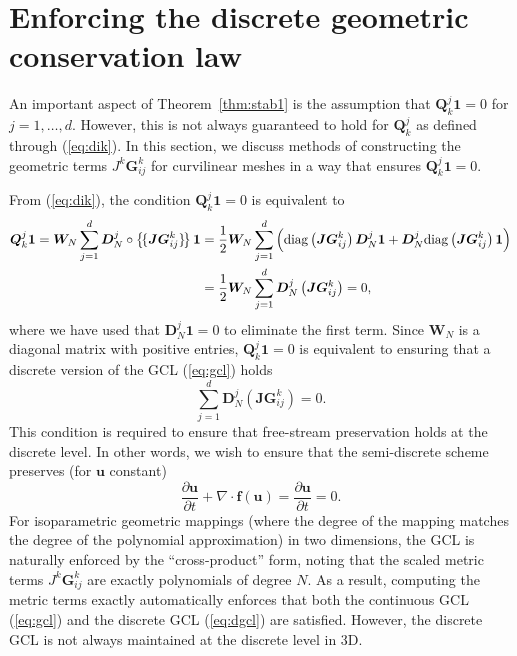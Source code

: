 \documentclass[preprint,10pt]{article}
\theoremstyle{definition}
\theoremstyle{lemma}
\theoremstyle{theorem}
\theoremstyle{assumption}
\newcommand{\pd}[2]{\frac{\partial#1}{\partial#2}}
\newcommand{\LRp}[1]{\left( #1 \right)}
\newcommand{\LRc}[1]{\left\{ #1 \right\}}
\newcommand{\avg}[1] {\ensuremath{\LRc{\!\{#1\}\!}}}
\newcommand{\Grad} {\ensuremath{\nabla}}
\newcommand{\diag}[1]{{\rm diag}\LRp{#1}}
\begin{document}
{\section{Enforcing the discrete geometric conservation law}

An important aspect of Theorem~\ref{thm:stab1} is the assumption that $\bm{Q}^j_k\bm{1} = 0$ for $j = 1,\ldots,d$.  However, this is not always guaranteed to hold for $\bm{Q}^j_k$ as defined through (\ref{eq:dik}).  In this section, we discuss methods of constructing the geometric terms $J^k\bm{G}^k_{ij}$ for curvilinear meshes in a way that ensures $\bm{Q}^j_k\bm{1} = 0$.  

From (\ref{eq:dik}), the condition $\bm{Q}^j_k\bm{1} = 0$ is equivalent to
\begin{align*}
\bm{Q}^j_k\bm{1} = \bm{W}_N\sum_{j=1}^d\bm{D}^j_N\circ \avg{\bm{JG}_{ij}^k}\bm{1} &= \frac{1}{2}\bm{W}_N\sum_{j=1}^d \LRp{ \diag{\bm{JG}_{ij}^k}\bm{D}^j_N \bm{1} + \bm{D}^j_N\diag{\bm{JG}_{ij}^k}\bm{1}} \\
&= \frac{1}{2}\bm{W}_N\sum_{j=1}^d \bm{D}^j_N\LRp{\bm{JG}_{ij}^k} = 0,
\end{align*}
where we have used that $\bm{D}^j_N \bm{1} = 0$ to eliminate the first term.  Since $\bm{W}_N$ is a diagonal matrix with positive entries, $\bm{Q}^j_k\bm{1} = 0$ is equivalent to ensuring that a discrete version of the GCL (\ref{eq:gcl}) holds
\begin{equation}
\sum_{j=1}^d \bm{D}^j_N\LRp{\bm{JG}_{ij}^k} = 0.
\label{eq:dgcl}
\end{equation}
This condition is required to ensure that free-stream preservation holds at the discrete level.  In other words, we wish to ensure that the semi-discrete scheme preserves (for $\bm{u}$ constant) 
\[
\pd{\bm{u}}{t} + \Grad \cdot \bm{f}(\bm{u}) = \pd{\bm{u}}{t} = 0.
\]
For isoparametric geometric mappings (where the degree of the mapping matches the degree of the polynomial approximation) in two dimensions, the GCL is naturally enforced by the ``cross-product'' form, noting that the scaled metric terms $J^k\bm{G}^k_{ij}$ are exactly polynomials of degree $N$.  As a result, computing the metric terms exactly automatically enforces that both the continuous GCL (\ref{eq:gcl}) and the discrete GCL (\ref{eq:dgcl}) are satisfied.  However, the discrete GCL is not always maintained at the discrete level in 3D.  

}
\end{document}
